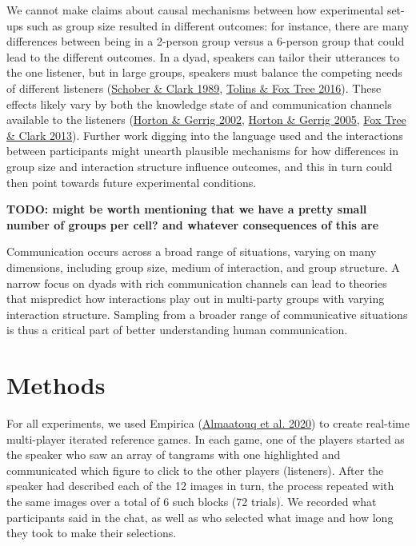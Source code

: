 \documentclass[
  english,
]{article}
\begin{document}
We cannot make claims about causal mechanisms between how experimental set-ups such as group size resulted in different outcomes: for instance, there are many differences between being in a 2-person group versus a 6-person group that could lead to the different outcomes. In a dyad, speakers can tailor their utterances to the one listener, but in large groups, speakers must balance the competing needs of different listeners (\protect\hyperlink{ref-schober1989}{Schober \& Clark 1989}, \protect\hyperlink{ref-tolins2016}{Tolins \& Fox Tree 2016}). These effects likely vary by both the knowledge state of and communication channels available to the listeners (\protect\hyperlink{ref-horton2002}{Horton \& Gerrig 2002}, \protect\hyperlink{ref-horton2005}{Horton \& Gerrig 2005}, \protect\hyperlink{ref-fox-tree2013}{Fox Tree \& Clark 2013}). Further work digging into the language used and the interactions between participants might unearth plausible mechanisms for how differences in group size and interaction structure influence outcomes, and this in turn could then point towards future experimental conditions.

\textbf{TODO: might be worth mentioning that we have a pretty small number of groups per cell? and whatever consequences of this are }

Communication occurs across a broad range of situations, varying on many dimensions, including group size, medium of interaction, and group structure.
A narrow focus on dyads with rich communication channels can lead to theories that mispredict how interactions play out in multi-party groups with varying interaction structure.
Sampling from a broader range of communicative situations is thus a critical part of better understanding human communication.

\hypertarget{methods}{%
\section{Methods}\label{methods}}

For all experiments, we used Empirica (\protect\hyperlink{ref-almaatouq2020}{Almaatouq et al. 2020}) to create real-time multi-player iterated reference games. In each game, one of the players started as the speaker who saw an array of tangrams with one highlighted and communicated which figure to click to the other players (listeners). After the speaker had described each of the 12 images in turn, the process repeated with the same images over a total of 6 such blocks (72 trials). We recorded what participants said in the chat, as well as who selected what image and how long they took to make their selections.
\end{document}
